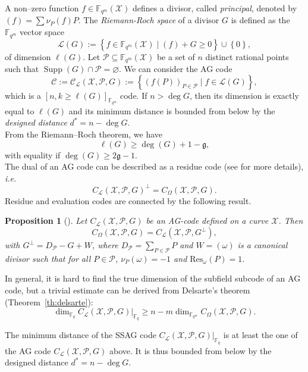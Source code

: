 \documentclass[a4paper]{amsart}
\newtheorem{proposition}[thm]{Proposition}
\theoremstyle{definition}
\theoremstyle{remark}
\newcommand{\calP}{\mathcal{P}}
\newcommand{\calL}{\mathcal{L}}
\newcommand{\calC}{\mathcal{C}}
\newcommand{\calX}{\mathcal{X}}
\newcommand{\fqm}{\mathbb{F}_{q^m}}
\newcommand{\fq}{\mathbb{F}_{q}}
\newcommand{\set}[1]{\left\{#1\right\}}
\newcommand{\Supp}{\operatorname{Supp}}
\newcommand{\ssag}[1]{\operatorname{\mathsf{SSAG}}_{q}\left(#1\right)}
\begin{document}
A non--zero function $f \in \fqm(\calX)$ defines a divisor, called \emph{principal}, denoted by $(f)=\sum \nu_P(f) P$. The \emph{Riemann-Roch space} of a divisor $G$ is defined as the $\fqm$ vector space
$$ \calL(G) := \set{f \in \fqm(\calX) \mid (f) + G \geq 0} \cup \set{0},$$
of dimension $\ell(G)$.
Let $\calP \subseteq \fqm(\calX)$ be a set of $n$ distinct rational points such that $\Supp(G) \cap \calP = \varnothing$.
We can consider the AG code 
$$\calC := \calC_{\calL}(\calX,\calP,G) := \set{\left(f(P)\right)_{P \in \calP} \mid f \in \calL(G)},$$
which is a $[n, k \geq \ell(G)]_{\fqm}$ code. If $n > \deg G$, then its dimension is exactly equal to $\ell(G)$ and its minimum distance is bounded from below by the \emph{designed distance} $d^*=n-\deg G$.\\
From the Riemann--Roch theorem, we have
$$ \ell(G) \geq \deg(G) +1 - \mathfrak{g},$$ 
with equality if $\deg(G) \geq 2\mathfrak{g}-1$.\\

The dual of an AG code can be described as a residue code (see \cite{Sti09} for more details), \emph{i.e.}
$$ C_{\calL}(\calX,\calP,G)^{\perp} = C_{\Omega}(\calX,\calP,G).$$ 
Residue and evaluation codes are connected by the following result.

\begin{proposition} [{\cite[Proposition~2.2.10]{Sti09}}] \label{prop:dual_AG_codes}
Let $C_{\calL}(\calX,\calP,G)$ be an AG-code defined on a curve $\calX$. Then 
\[C_{\Omega}(\calX,\calP,G) = C_{\calL}(\calX,\calP,G^{\perp}),\]
with $G^{\perp} = D_{\calP}-G+W$, where $D_{\calP} = \sum\limits_{P \in \calP} P$ and $W=(\omega)$ is a canonical divisor such that for all $P \in \calP$, $\nu_P(\omega)=-1$ and $\mathrm{Res}_{\omega}(P)=1$. 
\end{proposition}


In general, it is hard to find the true dimension of the subfield subcode of an AG code, but a trivial estimate can be derived from Delsarte's theorem (Theorem~\ref{th:delsarte}):
\begin{equation}\label{eq:dim_ssag}
	\dim_{\fq} C_{\calL}(\calX,\calP,G)|_{\fq} \geq n - m\dim_{\fqm} C_{\Omega}(\calX,\calP,G).
\end{equation}

The minimum distance of the SSAG code $C_{\calL}(\calX,\calP,G)|_{\fq}$ is at least the one of the AG code $C_{\calL}(\calX,\calP,G)$ above. It is thus bounded from below by the designed distance $d^*=n-\deg G$.%
\end{document}
